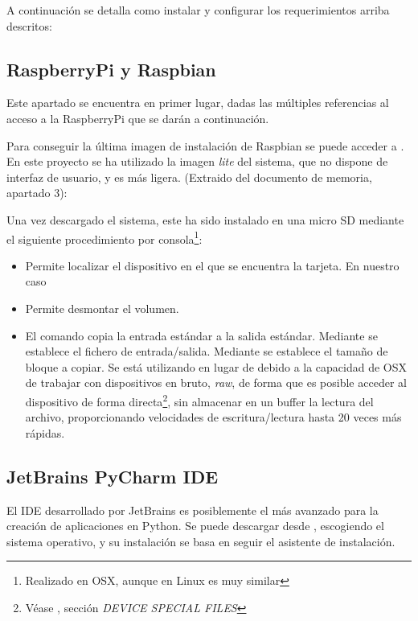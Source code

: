 A continuación se detalla como instalar y configurar los requerimientos arriba descritos: 

\subsection{RaspberryPi y Raspbian}
\label{subsec:raspbian}
Este apartado se encuentra en primer lugar, dadas las múltiples referencias al acceso a la RaspberryPi que se darán a continuación. 

Para conseguir la última imagen de instalación de Raspbian se puede acceder a \citep{wiki:raspbian}. En este proyecto se ha utilizado la imagen \emph{lite} del sistema, que no dispone de interfaz de usuario, y es más ligera. (Extraido del documento de memoria, apartado 3):

Una vez descargado el sistema, este ha sido instalado en una micro SD mediante el siguiente procedimiento por consola\footnote{Realizado en OSX, aunque en Linux es muy similar}:
\begin{itemize}
\item{} Permite localizar el dispositivo en el que se encuentra la tarjeta. En nuestro caso 
\item{} Permite desmontar el volumen. 
\item{} El comando  copia la entrada estándar a la salida estándar. Mediante  se establece el fichero de entrada/salida. Mediante  se establece el tamaño de bloque a copiar. Se está utilizando  en lugar de  debido a la capacidad de OSX de trabajar con dispositivos en bruto, \textit{raw}, de forma que es posible acceder al dispositivo de forma directa\footnote{Véase , sección \textit{DEVICE SPECIAL FILES}}, sin almacenar en un buffer la lectura del archivo, proporcionando velocidades de escritura/lectura hasta 20 veces más rápidas.
\end{itemize}

\subsection{JetBrains PyCharm IDE}
\label{subsec:pycharm}
El IDE desarrollado por JetBrains es posiblemente el más avanzado para la creación de aplicaciones en Python. Se puede descargar desde \citep{wiki:PyCharm}, escogiendo el sistema operativo, y su instalación se basa en seguir el asistente de instalación.

